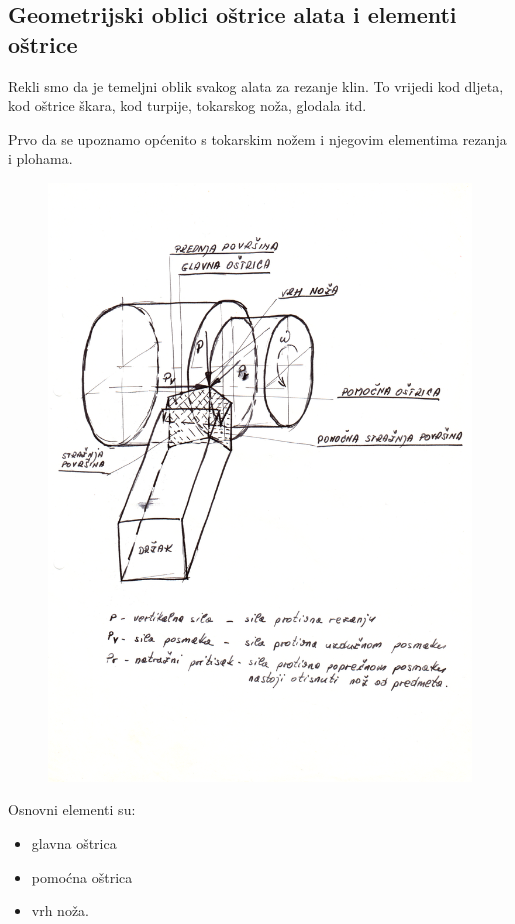 \documentclass[a4paper,12pt]{article}
\numberwithin{figure}{section}
\begin{document}
\subsection{Geometrijski oblici oštrice alata i elementi oštrice}
Rekli smo da je temeljni oblik svakog alata za rezanje klin. To vrijedi kod dljeta, kod oštrice škara, kod turpije, tokarskog noža, glodala itd. \par
Prvo da se upoznamo općenito s tokarskim nožem i njegovim elementima rezanja i plohama.
\begin{figure}[!h]
\centering
\includegraphics[width=\textwidth]{image_01.png}
\end{figure}
\FloatBarrier
\noindent Osnovni elementi su:
\begin{itemize}
\item glavna oštrica
\item pomoćna oštrica
\item vrh noža.
\end{itemize}
\end{document}

